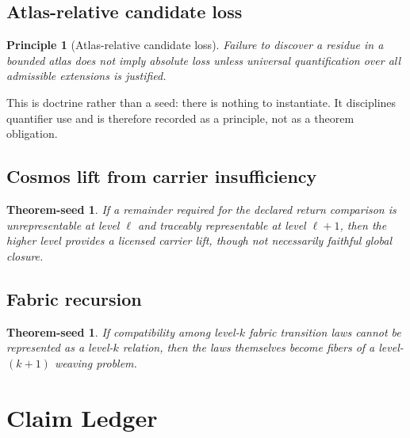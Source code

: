 \documentclass[12pt,openany]{book}
\newtheorem{principle}[definition]{Principle}
\newtheorem{theoremseed}[definition]{Theorem-seed}
\theoremstyle{remark}
\begin{document}
\section{Atlas-relative candidate loss}
\begin{principle}[Atlas-relative candidate loss]
Failure to discover a residue in a bounded atlas does not imply absolute loss unless universal quantification over all admissible extensions is justified.
\end{principle}

This is doctrine rather than a seed: there is nothing to instantiate. It disciplines quantifier use and is therefore recorded as a principle, not as a theorem obligation.

\section{Cosmos lift from carrier insufficiency}
\begin{theoremseed}
If a remainder required for the declared return comparison is unrepresentable at level $\ell$ and traceably representable at level $\ell+1$, then the higher level provides a licensed carrier lift, though not necessarily faithful global closure.
\end{theoremseed}

\section{Fabric recursion}
\begin{theoremseed}
If compatibility among level-$k$ fabric transition laws cannot be represented as a level-$k$ relation, then the laws themselves become fibers of a level-$(k+1)$ weaving problem.
\end{theoremseed}

\chapter{Claim Ledger}
\label{ch:claims}
\end{document}
